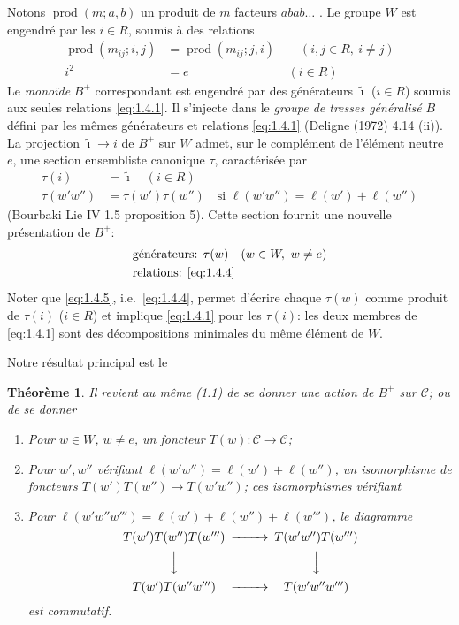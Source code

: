 \documentclass[11pt,a4paper]{article}
\theoremstyle{plain}
\newtheorem{theorem}{Th\'eor\`eme}[section]
\theoremstyle{definition}
\newcommand{\cC}{\mathscr{C}}
\begin{document}
Notons $\operatorname{prod}(m; a, b)$ un produit de $m$ facteurs $abab\ldots$ . Le groupe $W$ est engendr\'e par les $i \in R$, soumis \`a des relations
\begin{align}
\operatorname{prod}(m_{ij}; i, j) &= \operatorname{prod}(m_{ij}; j, i) \qquad (i, j \in R,\ i \not= j) \label{eq:1.4.1} \\
i^2 &= e \qquad\qquad\qquad\qquad (i \in R) \label{eq:1.4.2}
\end{align}
Le \emph{mono\"ide} $B^+$ correspondant est engendr\'e par des g\'en\'erateurs $\tilde{\imath}$ ($i \in R$) soumis aux seules relations \eqref{eq:1.4.1}. Il s'injecte dans le \emph{groupe de tresses g\'en\'eralis\'e} $B$ d\'efini par les m\^emes g\'en\'erateurs et relations \eqref{eq:1.4.1} (Deligne (1972) 4.14 (ii)). La projection $\tilde{\imath} \to i$ de $B^+$ sur $W$ admet, sur le compl\'ement de l'\'el\'ement neutre $e$, une section ensembliste canonique $\tau$, caract\'eris\'ee par
\begin{align}
\tau(i) &= \tilde{\imath} \quad (i \in R) \label{eq:1.4.3} \\
\tau(w'w'') &= \tau(w')\tau(w'') \quad \text{si } \ell(w'w'') = \ell(w') + \ell(w'') \label{eq:1.4.4}
\end{align}
(Bourbaki Lie IV 1.5 proposition 5). Cette section fournit une nouvelle pr\'esentation de $B^+$:
\begin{align}
&\text{g\'en\'erateurs: } \tau(w) \quad (w \in W,\ w \not= e) \label{eq:1.4.5} \\
&\text{relations: } \eqref{eq:1.4.4} \notag
\end{align}
Noter que \eqref{eq:1.4.5}, i.e.\ \eqref{eq:1.4.4}, permet d'\'ecrire chaque $\tau(w)$ comme produit de $\tau(i)$ ($i \in R$) et implique \eqref{eq:1.4.1} pour les $\tau(i)$: les deux membres de \eqref{eq:1.4.1} sont des d\'ecompositions minimales du m\^eme \'el\'ement de $W$.

Notre r\'esultat principal est le

\begin{theorem}\label{thm:1.5}
Il revient au m\^eme \textup{(1.1)} de se donner une action de $B^+$ sur $\cC$; ou de se donner
\begin{enumerate}
\item[(1.5.1)] Pour $w \in W$, $w \not= e$, un foncteur $T(w) : \cC \to \cC$;
\item[(1.5.2)] Pour $w', w''$ v\'erifiant $\ell(w'w'') = \ell(w') + \ell(w'')$, un isomorphisme de foncteurs $T(w')T(w'') \to T(w'w'')$; ces isomorphismes v\'erifiant
\item[(1.5.3)] Pour $\ell(w'w''w''') = \ell(w') + \ell(w'') + \ell(w''')$, le diagramme
\[
\begin{CD}
T(w') T(w'') T(w''') @>>> T(w'w'') T(w''') \\
@VVV @VVV \\
T(w') T(w''w''') @>>> T(w'w''w''')
\end{CD}
\]
est commutatif.
\end{enumerate}
\end{theorem}
\end{document}
